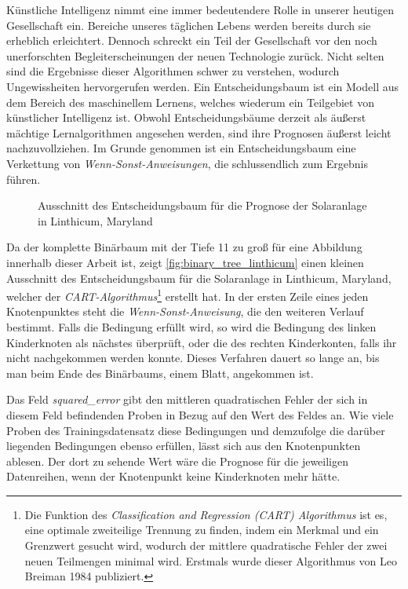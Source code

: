 \documentclass[12pt, a4paper]{article}
\begin{document}
Künstliche Intelligenz nimmt eine immer bedeutendere Rolle in unserer heutigen Gesellschaft ein. Bereiche unseres täglichen Lebens werden bereits durch sie erheblich erleichtert. Dennoch schreckt ein Teil der Gesellschaft vor den noch unerforschten Begleiterscheinungen der neuen Technologie zurück. Nicht selten sind die Ergebnisse dieser Algorithmen schwer zu verstehen, wodurch Ungewissheiten hervorgerufen werden. 
Ein Entscheidungsbaum ist ein Modell aus dem Bereich des maschinellem Lernens, welches wiederum ein Teilgebiet von künstlicher Intelligenz ist. Obwohl Entscheidungsbäume derzeit als äußerst mächtige Lernalgorithmen angesehen werden, sind ihre Prognosen äußerst leicht nachzuvollziehen. Im Grunde genommen ist ein Entscheidungsbaum eine Verkettung von \textit{Wenn-Sonst-Anweisungen}, die schlussendlich zum Ergebnis führen. 

\begin{figure}
\centering
\def\svgwidth{425pt}

\caption{Ausschnitt des Entscheidungsbaum für die Prognose der Solaranlage in Linthicum, Maryland}
\label{fig:binary_tree_linthicum}
\end {figure}

Da der komplette Binärbaum mit der Tiefe 11 zu groß für eine Abbildung innerhalb dieser Arbeit ist, zeigt \autoref{fig:binary_tree_linthicum} einen kleinen Ausschnitt des Entscheidungsbaum für die Solaranlage in Linthicum, Maryland, welcher der \textit{CART-Algorithmus}\footnote{Die Funktion des \textit{Classification and Regression (CART) Algorithmus} ist es, eine optimale zweiteilige Trennung zu finden, indem ein Merkmal und ein Grenzwert gesucht wird, wodurch der mittlere quadratische Fehler der zwei neuen Teilmengen minimal wird. Erstmals wurde dieser Algorithmus von Leo Breiman 1984 publiziert.} erstellt hat. In der ersten Zeile eines jeden Knotenpunktes steht die \textit{Wenn-Sonst-Anweisung}, die den weiteren Verlauf bestimmt. Falls die Bedingung erfüllt wird, so wird die Bedingung des linken Kinderknoten als nächstes überprüft, oder die des rechten Kinderkonten, falls ihr nicht nachgekommen werden konnte. Dieses Verfahren dauert so lange an, bis man beim Ende des Binärbaums, einem Blatt, angekommen ist.

Das Feld \textit{squared\_error} gibt den mittleren quadratischen Fehler der sich in diesem Feld befindenden Proben in Bezug auf den Wert des Feldes an. Wie viele Proben des Trainingsdatensatz diese Bedingungen und demzufolge die darüber liegenden Bedingungen ebenso erfüllen, lässt sich aus den Knotenpunkten ablesen. Der dort zu sehende Wert wäre die Prognose für die jeweiligen Datenreihen, wenn der Knotenpunkt keine Kinderknoten mehr hätte.
\end{document}
